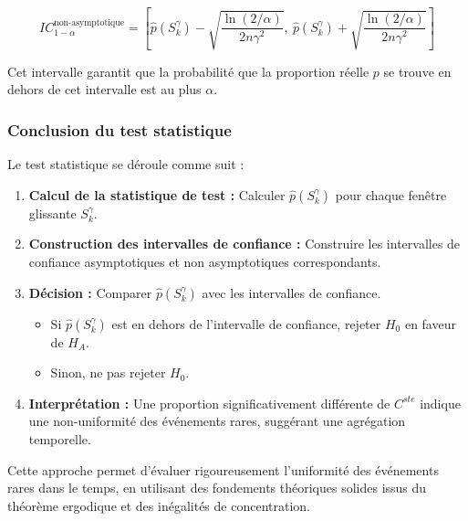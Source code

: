 \documentclass[12pt,a4paper]{article}
\theoremstyle{definition}
\theoremstyle{remark}
\begin{document}
$$
IC_{1 - \alpha}^{\text{non-asymptotique}} = \left[ \hat{p}(S_k^{\gamma}) - \sqrt{\frac{\ln(2/\alpha)}{2 n \gamma^2}}, \ \hat{p}(S_k^{\gamma}) + \sqrt{\frac{\ln(2/\alpha)}{2 n \gamma^2}} \right]
$$

Cet intervalle garantit que la probabilité que la proportion réelle $p$ se trouve en dehors de cet intervalle est au plus $\alpha$.

\subsubsection{Conclusion du test statistique}

Le test statistique se déroule comme suit :

\begin{enumerate}
    \item \textbf{Calcul de la statistique de test :} Calculer $\hat{p}(S_k^{\gamma})$ pour chaque fenêtre glissante $S_k^{\gamma}$.
    \item \textbf{Construction des intervalles de confiance :} Construire les intervalles de confiance asymptotiques et non asymptotiques correspondants.
    \item \textbf{Décision :} Comparer $\hat{p}(S_k^{\gamma})$ avec les intervalles de confiance.
    \begin{itemize}
        \item Si $\hat{p}(S_k^{\gamma})$ est en dehors de l'intervalle de confiance, rejeter $H_0$ en faveur de $H_A$.
        \item Sinon, ne pas rejeter $H_0$.
    \end{itemize}
    \item \textbf{Interprétation :} Une proportion significativement différente de $C^{ste}$ indique une non-uniformité des événements rares, suggérant une agrégation temporelle.
\end{enumerate}

Cette approche permet d'évaluer rigoureusement l'uniformité des événements rares dans le temps, en utilisant des fondements théoriques solides issus du théorème ergodique et des inégalités de concentration.

\end{document}
